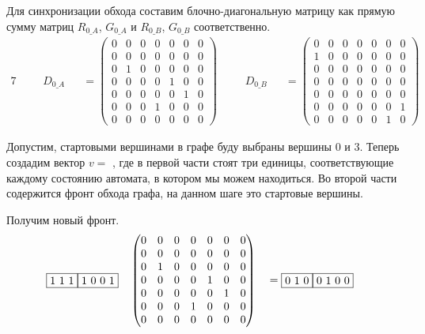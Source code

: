 \begin{example}
  Для синхронизации обхода составим блочно-диагональную матрицу как прямую сумму матриц $R_{0\_A}$, $G_{0\_A}$ и $R_{0\_B}$, $G_{0\_B}$ соответственно.
  \begin{alignat*}{7}
    & &&D_{0\_A} &&= \begin{pmatrix}
      0 & 0 & 0 & 0 & 0 & 0 & 0 \\
      0 & 0 & 0 & 0 & 0 & 0 & 0 \\
      0 & 1 & 0 & 0 & 0 & 0 & 0 \\
      0 & 0 & 0 & 0 & 1 & 0 & 0 \\
      0 & 0 & 0 & 0 & 0 & 1 & 0 \\
      0 & 0 & 0 & 1 & 0 & 0 & 0 \\
      0 & 0 & 0 & 0 & 0 & 0 & 0 
      \end{pmatrix} \ \ \ \ &&D_{0\_B} &&= \begin{pmatrix}
        0 & 0 & 0 & 0 & 0 & 0 & 0 \\
        1 & 0 & 0 & 0 & 0 & 0 & 0 \\
        0 & 0 & 0 & 0 & 0 & 0 & 0 \\
        0 & 0 & 0 & 0 & 0 & 0 & 0 \\
        0 & 0 & 0 & 0 & 0 & 0 & 0 \\
        0 & 0 & 0 & 0 & 0 & 0 & 1 \\
        0 & 0 & 0 & 0 & 0 & 1 & 0 
        \end{pmatrix}
    \end{alignat*}

  Допустим, стартовыми вершинами в графе буду выбраны вершины 0 и 3.
  Теперь создадим вектор $v = $  , где в первой части стоят три единицы, соответствующие каждому состоянию автомата, в котором мы можем находиться. Во второй части содержится фронт обхода графа, на данном шаге это стартовые вершины.
  
  Получим новый фронт.
  \begin{alignat*}{7}
    & \begin{matrix}
      \fbox{1 1 1} \fbox{1 0 0 1}
      \end{matrix}  && \begin{pmatrix}
        0 & 0 & 0 & 0 & 0 & 0 & 0 \\
        0 & 0 & 0 & 0 & 0 & 0 & 0 \\
        0 & 1 & 0 & 0 & 0 & 0 & 0 \\
        0 & 0 & 0 & 0 & 1 & 0 & 0 \\
        0 & 0 & 0 & 0 & 0 & 1 & 0 \\
        0 & 0 & 0 & 1 & 0 & 0 & 0 \\
        0 & 0 & 0 & 0 & 0 & 0 & 0 
        \end{pmatrix} &&= \begin{matrix}
          \fbox{0 1 0} \fbox{0 1 0 0} 
          \end{matrix}
    \end{alignat*}


\end{example}
